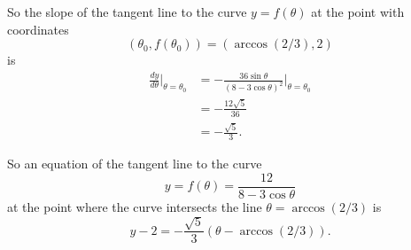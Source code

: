 \documentclass{ximera}
\begin{document}
\begin{question}
\begin{explanation}
So the slope of the tangent line to the curve $y=f(\theta)$ at the point with coordinates
\[
  (\theta_0,f(\theta_0)) = \left( \arccos(2/3), 2  \right)
\]
is
\begin{align*}
 \frac{dy}{d\theta}\Big|_{\theta = \theta_0}  &= -\frac{36\sin\theta}{(8 - 3\cos\theta)^2} \Big|_{\theta = \theta_0} \\
                                                                 &= -\frac{12\sqrt{5}}{36} \\
                                                                  &= - \frac{\sqrt{5}}{3}.
\end{align*}

So an equation of the tangent line to the curve \[
       y  = f(\theta) = \frac{12}{8 - 3\cos\theta}
\]
at the point where the curve intersects the line $\theta =\arccos(2/3)$ is
\[
    y - 2 = - \frac{\sqrt{5}}{3}\left( \theta -\arccos(2/3)  \right) .
\]

\end{explanation}

\end{question}
\end{document}
